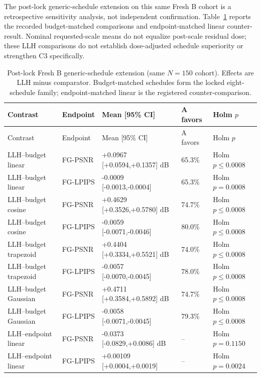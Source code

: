 \documentclass[11pt]{article}
\begin{document}
The post-lock generic-schedule extension on this same Fresh B cohort is a retrospective sensitivity analysis, not independent confirmation. Table~\ref{tab:supp-generic} reports the recorded budget-matched comparisons and endpoint-matched linear counter-result. Nominal requested-scale means do not equalize post-scale residual dose; these LLH comparisons do not establish dose-adjusted schedule superiority or strengthen C3 specifically.

\clearpage
\begingroup\scriptsize
\begin{longtable}{p{3.4cm}p{1.7cm}p{4.4cm}p{1.3cm}p{2.4cm}}
\caption{Post-lock Fresh B generic-schedule extension (same $N=150$ cohort). Effects are LLH minus comparator. Budget-matched schedules form the locked eight-schedule family; endpoint-matched linear is the registered counter-comparison.}\label{tab:supp-generic}\\
\toprule Contrast & Endpoint & Mean [95\% CI] & A favors & Holm $p$ \\
\midrule\endfirsthead
\toprule Contrast & Endpoint & Mean [95\% CI] & A favors & Holm $p$ \\
\midrule\endhead
LLH--budget linear & FG-PSNR & +0.0967 [+0.0594,+0.1357] dB & 65.3\% & Holm $p\leq0.0008$ \\
LLH--budget linear & FG-LPIPS & -0.0009 [-0.0013,-0.0004] & 65.3\% & Holm $p=0.0008$ \\
LLH--budget cosine & FG-PSNR & +0.4629 [+0.3526,+0.5780] dB & 74.7\% & Holm $p\leq0.0008$ \\
LLH--budget cosine & FG-LPIPS & -0.0059 [-0.0071,-0.0046] & 80.0\% & Holm $p\leq0.0008$ \\
LLH--budget trapezoid & FG-PSNR & +0.4404 [+0.3334,+0.5521] dB & 74.0\% & Holm $p\leq0.0008$ \\
LLH--budget trapezoid & FG-LPIPS & -0.0057 [-0.0070,-0.0045] & 78.0\% & Holm $p\leq0.0008$ \\
LLH--budget Gaussian & FG-PSNR & +0.4711 [+0.3584,+0.5892] dB & 74.7\% & Holm $p\leq0.0008$ \\
LLH--budget Gaussian & FG-LPIPS & -0.0058 [-0.0071,-0.0045] & 79.3\% & Holm $p\leq0.0008$ \\
LLH--endpoint linear & FG-PSNR & -0.0373 [-0.0829,+0.0086] dB & -- & Holm $p=0.1150$ \\
LLH--endpoint linear & FG-LPIPS & +0.00109 [+0.0004,+0.0019] & -- & Holm $p=0.0024$ \\
\bottomrule
\end{longtable}
\endgroup
\end{document}
